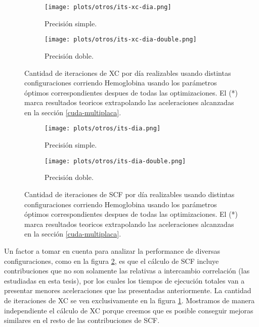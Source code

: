 \begin{figure}[htbp]
\centering
  \begin{subfigure}[b]{\plotwidthtres}
    \texttt{[image: plots/otros/its-xc-dia.png]}
    \caption{Precisi\'on simple.}
  \end{subfigure}
  \begin{subfigure}[b]{\plotwidthtres}
    \texttt{[image: plots/otros/its-xc-dia-double.png]}
    \caption{Precisi\'on doble.}
  \end{subfigure}
  \caption{Cantidad de iteraciones de XC por d\'ia realizables usando distintas configuraciones corriendo Hemoglobina usando los
            par\'ametros \'optimos correspondientes despues de todas las optimizaciones. El (*) marca resultados teoricos extrapolando
            las aceleraciones alcanzadas en la secci\'on \ref{cuda-multiplaca}.}
  \label{fig:its-xc-dia}
\end{figure}


\begin{figure}[htbp]
\centering
  \begin{subfigure}[b]{\plotwidthtres}
    \texttt{[image: plots/otros/its-dia.png]}
    \caption{Precisi\'on simple.}
  \end{subfigure}
  \begin{subfigure}[b]{\plotwidthtres}
    \texttt{[image: plots/otros/its-dia-double.png]}
    \caption{Precisi\'on doble.}
  \end{subfigure}
    \caption{Cantidad de iteraciones de SCF por d\'ia realizables usando distintas configuraciones corriendo Hemoglobina usando los
              par\'ametros \'optimos correspondientes despues de todas las optimizaciones. El (*) marca resultados teoricos extrapolando
              las aceleraciones alcanzadas en la secci\'on \ref{cuda-multiplaca}.}
    \label{fig:its-dia}
\end{figure}

Un factor a tomar en cuenta para analizar la performance de diversas configuraciones, como en la figura \ref{fig:its-dia},
es que el c\'alculo de SCF incluye contribuciones que no son solamente las relativas a intercambio correlaci\'on
(las estudiadas en esta tesis), por los cuales los tiempos de ejecuci\'on totales van
a presentar menores aceleraciones que las presentadas anteriormente. La cantidad de iteraciones de XC se ven
exclusivamente en la figura \ref{fig:its-xc-dia}. Mostramos de manera independiente el c\'alculo de XC porque
creemos que es posible conseguir mejoras similares en el resto de las contribuciones de SCF.

